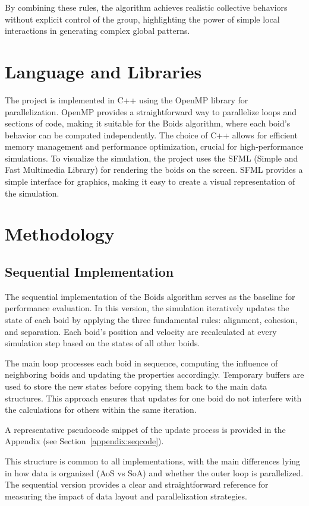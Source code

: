 \documentclass[10pt,twocolumn,letterpaper]{article}
\begin{document}
By combining these rules, the algorithm achieves realistic collective behaviors without explicit control of the group, highlighting the power of simple local interactions in generating complex global patterns.

\section{Language and Libraries}
The project is implemented in C++ using the OpenMP library for parallelization. OpenMP provides a straightforward way to parallelize loops and sections of code, making it suitable for the Boids algorithm, where each boid's behavior can be computed independently. The choice of C++ allows for efficient memory management and performance optimization, crucial for high-performance simulations.
To visualize the simulation, the project uses the SFML (Simple and Fast Multimedia Library) for rendering the boids on the screen. SFML provides a simple interface for graphics, making it easy to create a visual representation of the simulation.

\section{Methodology}
\subsection{Sequential Implementation}
The sequential implementation of the Boids algorithm serves as the baseline for performance evaluation. In this version, the simulation iteratively updates the state of each boid by applying the three fundamental rules: alignment, cohesion, and separation. Each boid's position and velocity are recalculated at every simulation step based on the states of all other boids.

The main loop processes each boid in sequence, computing the influence of neighboring boids and updating the properties accordingly. Temporary buffers are used to store the new states before copying them back to the main data structures. This approach ensures that updates for one boid do not interfere with the calculations for others within the same iteration.

A representative pseudocode snippet of the update process is provided in the Appendix (see Section~\ref{appendix:seqcode}).

This structure is common to all implementations, with the main differences lying in how data is organized (AoS vs SoA) and whether the outer loop is parallelized. The sequential version provides a clear and straightforward reference for measuring the impact of data layout and parallelization strategies.
\end{document}
